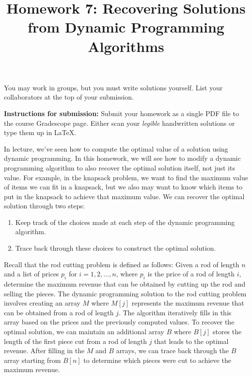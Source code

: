 \documentclass[10pt]{article}
\title{Homework 7: Recovering Solutions from Dynamic Programming Algorithms}
\date{}
\theoremstyle{definition}
\begin{document}
\maketitle
\thispagestyle{fancy}

\noindent You may work in groups, but you must write solutions yourself. List your collaborators at the top of your submission. 

\vspace{1em}

\noindent \textbf{Instructions for submission:} Submit your homework as a single PDF file to the course Gradescope page. Either scan your \emph{legible} handwritten solutions or type them up in \LaTeX. 

\vspace{5pt}

In lecture, we've seen how to compute the optimal value of a solution using dynamic programming. In this homework, we will see how to modify a dynamic programming algorithm to also recover the optimal solution itself, not just its value. For example, in the knapsack problem, we want to find the maximum value of items we can fit in a knapsack, but we also may want to know which items to put in the knapsack to achieve that maximum value.
We can recover the optimal solution through two steps:
\begin{enumerate}
    \item Keep track of the choices made at each step of the dynamic programming algorithm. 
    \item Trace back through these choices to construct the optimal solution.
\end{enumerate}

Recall that the rod cutting problem is defined as follows: Given a rod of length $n$ and a list of prices $p_i$ for $i = 1, 2, \ldots, n$, where $p_i$ is the price of a rod of length $i$, determine the maximum revenue that can be obtained by cutting up the rod and selling the pieces. The dynamic programming solution to the rod cutting problem involves creating an array $M$ where $M[j]$ represents the maximum revenue that can be obtained from a rod of length $j$. The algorithm iteratively fills in this array based on the prices and the previously computed values. To recover the optimal solution, we can maintain an additional array $B$ where $B[j]$ stores the length of the first piece cut from a rod of length $j$ that leads to the optimal revenue. After filling in the $M$ and $B$ arrays, we can trace back through the $B$ array starting from $B[n]$ to determine which pieces were cut to achieve the maximum revenue.
\end{document}
